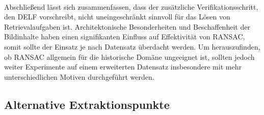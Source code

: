 \\
Abschließend lässt sich zusammenfassen, dass der zusätzliche Verifikationsschritt, den DELF vorschreibt, nicht uneingeschränkt sinnvoll für das Lösen von Retrievalaufgaben ist. Architektonische Besonderheiten und Beschaffenheit der Bildinhalte haben einen signifikanten Einfluss auf Effektivität von RANSAC, somit sollte der Einsatz je nach Datensatz überdacht werden. Um herauszufinden, ob RANSAC allgemein für die historische Domäne ungeeignet ist, sollten jedoch weiter Experimente auf einem erweiterten Datensatz insbesondere mit mehr unterschiedlichen Motiven durchgeführt werden.


\subsection{Alternative Extraktionspunkte}

